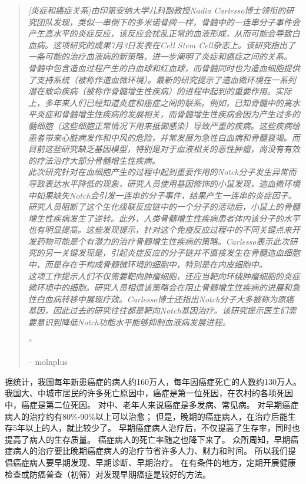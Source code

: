 \documentclass[10pt,a4paper]{article}
\newcommand{\NewsItem}[1]{ %
\usefont{T1}{fvs}{n}{n} %
\vspace{24pt}\large #1\vspace{3pt} %
\par \normalsize \normalfont}
\begin{document}
\begin{multicols}{2}
\begin{quotation}

\noindent\normalsize\textit{[炎症和癌症关系]由印第安纳大学儿科副教授Nadia Carlesso博士领衔的研究团队发现，类似一串倒下的多米诺骨牌一样，骨髓中的一连串分子事件会产生高水平的炎症反应，该反应会扰乱正常的血液形成，从而可能会导致白血病。这项研究的成果7月3日发表在Cell Stem Cell杂志上。该研究指出了一条可能的治疗血液病的新策略，进一步阐明了炎症和癌症之间的关系。\\
骨髓中包含造血过程产生的白血球和红血球，而骨髓同时也为造血细胞提供了支持系统（被称作造血微环境）。最新的研究提示了造血微环境在一系列潜在致命疾病（被称作骨髓增生性疾病）的进程中起到的重要作用。实际上，多年来人们已经知道炎症和癌症之间的联系。例如，已知骨髓中的高水平炎症和骨髓增生性疾病的发展相关，而骨髓增生性疾病会因为产生过多的髓细胞（这些细胞正常情况下用来抵御感染）导致严重的疾病。这些疾病给患者带来心脏病发作和中风的危险，并常发展为急性白血病和骨髓衰竭。而目前这些研究缺乏基因模型，特别是对于血液相关的恶性肿瘤，尚没有有效的疗法治疗大部分骨髓增生性疾病。\\
此次研究针对在血细胞产生的过程中起到重要作用的Notch分子发生异常而导致表达水平降低的现象，研究人员使用基因修饰的小鼠发现，造血微环境中如果缺失Notch会引发一连串的分子事件，结果产生一连串的炎症因子。研究人员阻断了这个生化级联反应链中的一个分子的活动后，小鼠上的骨髓增生性疾病发生了逆转。此外，人类骨髓增生性疾病患者体内该分子的水平也有明显提高。这些发现提示，针对这个免疫反应过程中的不同关键点来开发药物可能是个有潜力的治疗骨髓增生性疾病的策略。Carlesso表示此次研究的另一关键发现是，引起炎症反应的分子链并不直接发生在骨髓造血细胞中，而是存在于构成骨髓微环境的细胞中，特别是在内皮细胞中。\\
这项工作提示人们不仅需要靶向肿瘤细胞，还应当靶向环绕肿瘤细胞的炎症微环境中的细胞。研究人员相信该策略会在阻止骨髓增生性疾病的进展和急性白血病转移中展现疗效。Carlesso博士还指出Notch分子大多被称为原癌基因，因此过去的研究往往都是靶向Notch基因治疗。该研究提示医生们需要意识到降低Notch功能水平能够抑制血液病发展进程。}


\hfill{\Huge''}

\hfill-- molnplus
\end{quotation}


\NewsItem{{\color{hugored}{討論與總結}}}
据统计，我国每年新患癌症的病人约160万人，每年因癌症死亡的人数约130万人。
我国大、中城市居民的许多死亡原因中，癌症是第一位死因，在农村的各项死因中，癌症是第二位死因。
对中、老年人来说癌症是多发病、常见病。
对早期癌症病人的治疗约有80\%-90\%以上可以治愈；
但是，晚期的癌症病人，在治疗后能生存5年以上的人，就比较少了。
早期癌症病人治疗后，不仅提高了生存率，同时也提高了病人的生存质量。
癌症病人的死亡率随之也降下来了。
众所周知，早期癌症病人的治疗要比晚期癌症病人的治疗节省许多人力、财力和时间。
所以我们提倡癌症病人要早期发现、早期诊断、早期治疗。
在有条件的地方，定期开展健康检查或防癌普查（初筛）对发现早期癌症是较好的方法。


\end{multicols}
\end{document}

